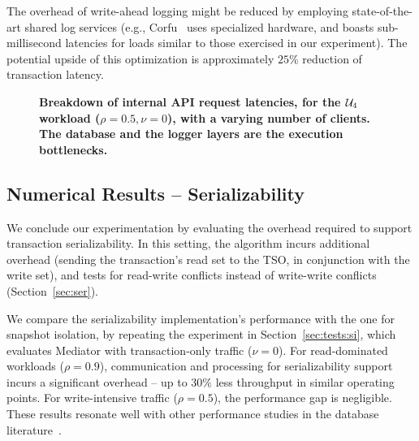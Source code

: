 The overhead of write-ahead logging might be reduced 
by employing state-of-the-art shared log services (e.g., Corfu~\cite{Corfu2012} 
uses specialized hardware, and boasts sub-millisecond latencies for loads similar 
to those exercised in our experiment). The potential upside 
of this optimization is approximately $25\%$ reduction of transaction latency.

\begin{figure}
\caption{\bf{\small{Breakdown of internal API request latencies, for the $\mathcal{U}_{4}$ workload 
($\rho=0.5, \nu=0$), with a varying number of clients. The database and the 
logger layers are the execution bottlenecks.}}}
\label{fig:latency_breakdown}
\end{figure}


\subsection{Numerical Results -- Serializability}
\label{sec:tests:ser}

We conclude our experimentation by evaluating the overhead required to support
transaction serializability. In this setting, the algorithm incurs additional 
overhead (sending the transaction's read set to the TSO, in conjunction with the write set), 
and tests for read-write conflicts instead of write-write conflicts (Section~\ref{sec:ser}). 

We compare the serializability implementation's performance with the one for snapshot isolation,
by repeating the experiment in Section~\ref{sec:tests:si}, which evaluates Mediator with transaction-only 
traffic ($\nu=0$). 
%
For read-dominated workloads ($\rho=0.9$), communication and
processing for serializability support incurs a significant overhead -- up to
$30\%$ less throughput in similar operating points. 
For write-intensive traffic ($\rho=0.5$), the performance gap is negligible. 
These results resonate well with other performance studies in the database 
literature~\cite{Alomari2008,Cahill2008}.


